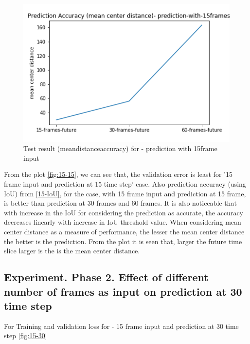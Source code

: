 \begin{figure}[H] 
\includegraphics[scale=0.8]{prediction-with-15frames-mean_distance_accuracy}
\begin{center}
\caption{Test result (mean\textunderscore distance\textunderscore accuracy) for - prediction with 15frame input }
\label{15-mcd}
\end{center}
\end{figure}

From the plot \ref{fig:15-15}, we can see that, the validation error is least for '15 frame input and prediction at 15 time step' case. Also prediction accuracy (using IoU) from \ref{15-IoU}, for the case, with 15 frame input and prediction at 15 frame, is better than prediction at 30 frames and 60 frames. It is also noticeable that with increase in the IoU for considering the prediction as accurate, the accuracy decreases linearly with increase in IoU threshold value. When considering mean center distance as a measure of performance, the lesser the mean center distance the better is the prediction. From the plot it is seen that, larger the future time slice larger is the is the mean center distance.

\subsection{Experiment. Phase 2. Effect of different number of frames as input on prediction at 30  time step}
For Training and validation loss for - 15 frame input and prediction at 30 time step \ref{fig:15-30}

